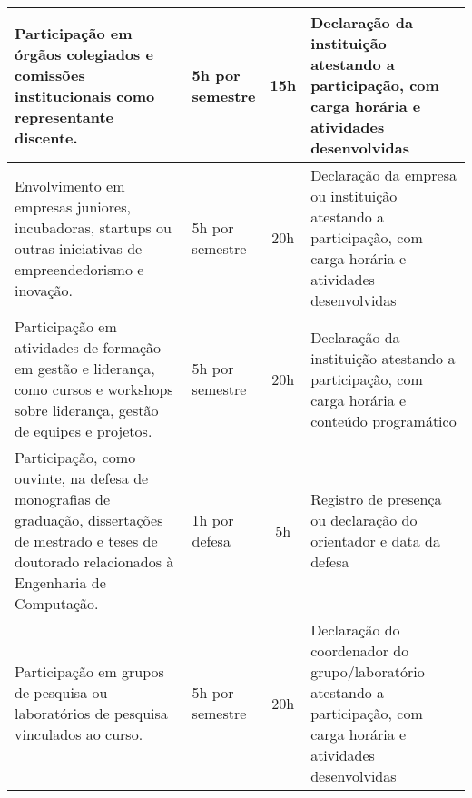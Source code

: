 \begin{small}
\begin{longtable}{m{5.6cm}m{2cm}c m{6.2cm}}
        Participação em órgãos colegiados e comissões institucionais como representante discente.
                                                                                                                                    & \parbox[t]{2cm}{\centering 5h por  \\semestre}\vspace{4pt}& 15h & Declaração da instituição atestando a participação, com carga horária e atividades desenvolvidas                      \\
        \hline
        Envolvimento em empresas juniores, incubadoras, startups ou outras iniciativas de empreendedorismo e inovação.
                                                                                                                                    & \parbox[t]{2cm}{\centering 5h por  \\semestre}\vspace{4pt}& 20h &Declaração da empresa ou instituição atestando a participação, com carga horária e atividades desenvolvidas           \\
        \hline
        Participação em atividades de formação em gestão e liderança, como cursos e workshops sobre liderança, gestão de equipes e projetos.
                                                                                                                                    & \parbox[t]{2cm}{\centering 5h por  \\semestre}\vspace{4pt}& 20h & Declaração da instituição atestando a participação, com carga horária e conteúdo programático                         \\
        \hline
        Participação, como ouvinte, na
        defesa de monografias de
        graduação, dissertações de mestrado e teses de doutorado relacionados à Engenharia de Computação.
                                                                                                                                    & \parbox[t]{2cm}{\centering 1h por  \\defesa}\vspace{4pt}& 5h &Registro de presença ou declaração do orientador  e data da defesa                                  \\
        \hline
        Participação em grupos de pesquisa ou laboratórios de pesquisa vinculados ao curso.                                         & \parbox[t]{2cm}{\centering 5h por  \\semestre}\vspace{4pt}&  20h & Declaração do coordenador do grupo/laboratório atestando a participação, com carga horária e atividades desenvolvidas \\
    \end{longtable}
\end{small}

